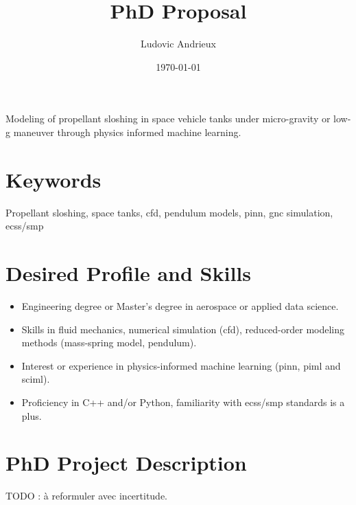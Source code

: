 \documentclass[12pt]{article}
\title{PhD Proposal}
\author{Ludovic Andrieux}
\date{\today}
\begin{document}
	\maketitle
	
	\begin{tcolorbox}[colback=gray!0, colframe=black, sharp corners, boxrule=0.5pt]
		Modeling of propellant sloshing in space vehicle tanks under micro-gravity or low-g maneuver through physics informed machine learning.
	\end{tcolorbox}
	
	\section*{Keywords}
	
	Propellant sloshing, space tanks, \acrshort{cfd}, pendulum models, \acrshort{pinn}, \acrshort{gnc} simulation, \acrshort{ecss}/\acrshort{smp}
	
	\section*{Desired Profile and Skills}
	
	\begin{itemize}
		\item Engineering degree or Master's degree in aerospace or applied data science.
		
		\item Skills in fluid mechanics, numerical simulation (\acrshort{cfd}), reduced-order modeling methods (mass-spring model, pendulum).
		
		\item Interest or experience in physics-informed machine learning (\acrshort{pinn}, \acrshort{piml} and \acrshort{sciml}).
		
		\item Proficiency in C++ and/or Python, familiarity with \acrshort{ecss}/\acrshort{smp} standards is a plus.
	\end{itemize}
	
	\section*{PhD Project Description}
	
	TODO : à reformuler avec incertitude.
	
\end{document}
